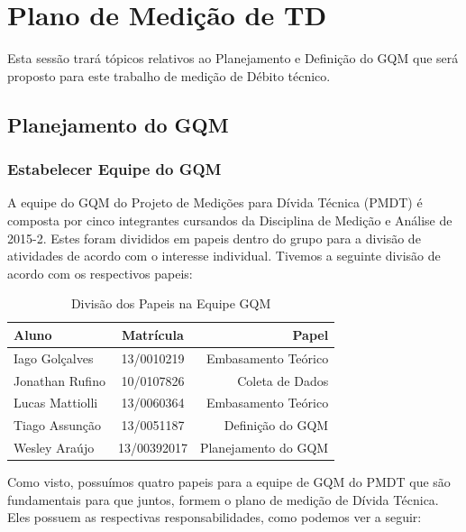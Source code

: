\chapter[Plano de Medição de TD ]{Plano de Medição de TD }

Esta sessão trará tópicos relativos ao Planejamento e Definição do GQM que será
proposto para este trabalho de medição de Débito técnico.

\section{Planejamento do GQM}
\subsection{Estabelecer Equipe do GQM}
A equipe do GQM do Projeto de Medições para Dívida Técnica (PMDT) é composta por
cinco integrantes cursandos da Disciplina de Medição e Análise de 2015-2. Estes
foram divididos em papeis dentro do grupo para a divisão de atividades de acordo
com o interesse individual. Tivemos a seguinte divisão de acordo com os respectivos
papeis:
\\


\begin{table}[ht]
\caption{Divisão dos Papeis na Equipe GQM}
\centering
\begin{tabular}{|l*{1}{c}r|}
\hline
Aluno              & Matrícula & Papel \\
\hline
Iago Golçalves & 13/0010219 &   Embasamento Teórico   \\
\hline
Jonathan  Rufino & 10/0107826 &   Coleta de Dados\\
\hline
Lucas Mattiolli & 13/0060364 &   Embasamento Teórico \\
\hline
Tiago Assunção & 13/0051187 &   Definição do GQM  \\
\hline
Wesley Araújo & 13/00392017 &   Planejamento do GQM \\
\hline
\end{tabular}
\label{table:papeisgqm}
\end{table}

Como visto, possuímos quatro papeis para a equipe de GQM do PMDT que são fundamentais
para que juntos, formem o plano de medição de Dívida Técnica. Eles possuem as respectivas
responsabilidades, como podemos ver a seguir:

